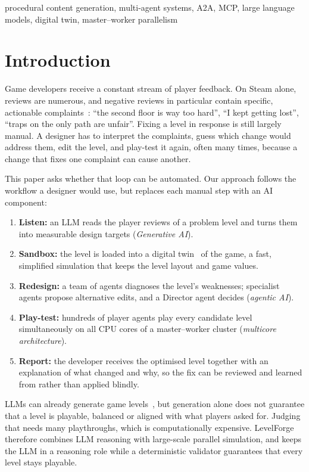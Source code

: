 \documentclass[conference]{IEEEtran}
\begin{document}
\begin{IEEEkeywords}
procedural content generation, multi-agent systems, A2A, MCP, large language models, digital twin, master--worker parallelism
\end{IEEEkeywords}

\section{Introduction}
Game developers receive a constant stream of player feedback. On Steam alone, reviews are numerous,
and negative reviews in particular contain specific, actionable complaints~\cite{lin2019steam}:
``the second floor is way too hard'', ``I kept getting lost'', ``traps on the only path are unfair''.
Fixing a level in response is still largely manual. A designer has to interpret the complaints,
guess which change would address them, edit the level, and play-test it again, often many times,
because a change that fixes one complaint can cause another.

This paper asks whether that loop can be automated. Our approach follows the workflow a designer
would use, but replaces each manual step with an AI component:
\begin{enumerate}
\item \textbf{Listen:} an LLM reads the player reviews of a problem level and turns them into
measurable design targets (\emph{Generative AI}).
\item \textbf{Sandbox:} the level is loaded into a digital twin~\cite{grieves2017twin} of the
game, a fast, simplified simulation that keeps the level layout and game values.
\item \textbf{Redesign:} a team of agents diagnoses the level's weaknesses; specialist agents
propose alternative edits, and a Director agent decides (\emph{agentic AI}).
\item \textbf{Play-test:} hundreds of player agents play every candidate level simultaneously on
all CPU cores of a master--worker cluster (\emph{multicore architecture}).
\item \textbf{Report:} the developer receives the optimised level together with an explanation
of what changed and why, so the fix can be reviewed and learned from rather than applied blindly.
\end{enumerate}

LLMs can already generate game levels~\cite{todd2023level,sudhakaran2023mariogpt}, but generation
alone does not guarantee that a level is playable, balanced or aligned with what players asked for.
Judging that needs many playthroughs, which is computationally expensive. LevelForge therefore
combines LLM reasoning with large-scale parallel simulation, and keeps the LLM in a reasoning role
while a deterministic validator guarantees that every level stays playable.
\end{document}
